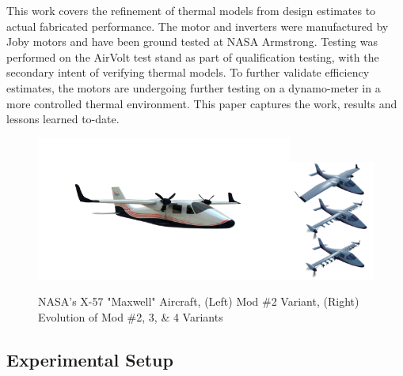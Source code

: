 \documentclass[]{aiaa-tc}%
\begin{document}
This work covers the refinement of thermal models from design estimates to actual fabricated performance. The motor and inverters were manufactured by Joby motors and have been ground tested at NASA Armstrong. Testing was performed on the AirVolt test stand as part of qualification testing, with the secondary intent of verifying thermal models. To further validate efficiency estimates, the motors are undergoing further testing on a dynamo-meter in a more controlled thermal environment. This paper captures the work, results and lessons learned to-date.

\begin{figure}[!htb]%
	\centering
	\includegraphics[width=0.75\textwidth]{figures/X57_mod2.png}\includegraphics[width=0.25\textwidth]{figures/Mod234.png}
	\caption{NASA's X-57 "Maxwell" Aircraft, (Left) Mod \#2 Variant, (Right) Evolution of Mod \#2, 3, \& 4 Variants}
	\label{fig:Mod2Big}
\end{figure}


\subsection{Experimental Setup}
\end{document}
